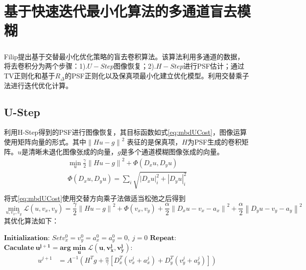 \documentclass[UTF8]{ctexart}
\newcommand{\myciteup}[1]{\textsuperscript{\textsuperscript{\cite{#1}}}}
\begin{document}
\begin{sloppypar}
        \section{基于快速迭代最小化算法的多通道盲去模糊}
        Filip\myciteup{2012Robust}提出基于交替最小化优化策略的盲去卷积算法。该算法利用多通道的数据，将去卷积分为两个步骤：1).$U-Step$图像恢复；2).$H-Step$进行PSF估计；通过TV正则化和基于$R_\Delta$的PSF正则化以及保真项最小化建立优化模型。利用交替乘子法进行迭代优化计算。
        \subsection{U-Step}
        利用H-Step得到的PSF进行图像恢复，其目标函数如式\eqref{eq:mbdUCost}，图像运算使用矩阵向量的形式。其中$\left\| Hu-g \right\|^2$ 表征的是保真项，$H$为PSF生成的卷积矩阵。$u$是清晰未退化图像张成的向量，$g$是多个通道模糊图像张成的向量。
        \begin{equation}
            \begin{array}{cc}
                \min\limits_u \frac{\gamma}{2}\left\| Hu-g \right\|^2 +\Phi(D_xu,D_yu)\\
                \Phi(D_xu,D_yu) = \sum\limits_i\sqrt{\left| D_xu\right|^2_i + \left|D_yu\right|^2_i}\\
            \end{array}
            \label{eq:mbdUCost}
        \end{equation}
        将式\eqref{eq:mbdUCost}使用交替方向乘子法做适当松弛之后得到
        \begin{equation}
            \min\limits_{u,v_x,v_y} \mathcal{L}(u,v_x,v_y)= \frac{\gamma}{2}\left\| Hu-g \right\|^2 + \Phi(v_x,v_y) + \frac{\alpha}{2}\left\| D_{x}u-v_x -a_x \right\|^2 + \frac{\alpha}{2}\left\| D_y u -v_y -a_y\right\|^2
        \end{equation}
        其优化算法如下：
        \begin{algorithm}
            \caption{$\hat{u}=u-step(u^0)$}
            \begin{algorithmic}
                \STATE $\bm{Initialization}$: $Set v_x^0=v_y^0=a_x^0=a_y^0=0,\ j = 0$
                \STATE $\bm{Repeat}$:
                \STATE $\bm{Caculate\ u^{j+1} =arg \min\limits_u \mathcal{L}(u,v_x^j,v_y^j) }$:
                \begin{equation}
                    \begin{aligned}
                        u^{j+1} &= A^{-1}\left(H^{T}g +  \frac{\alpha}{\gamma}\left[ D_x^T(v_x^j+a_x^j) + D_y^T(v_y^j+a_y^j) \right]\right)\\

\end{aligned}
\end{equation}
\end{algorithmic}
\end{algorithm}
\end{sloppypar}
\end{document}
